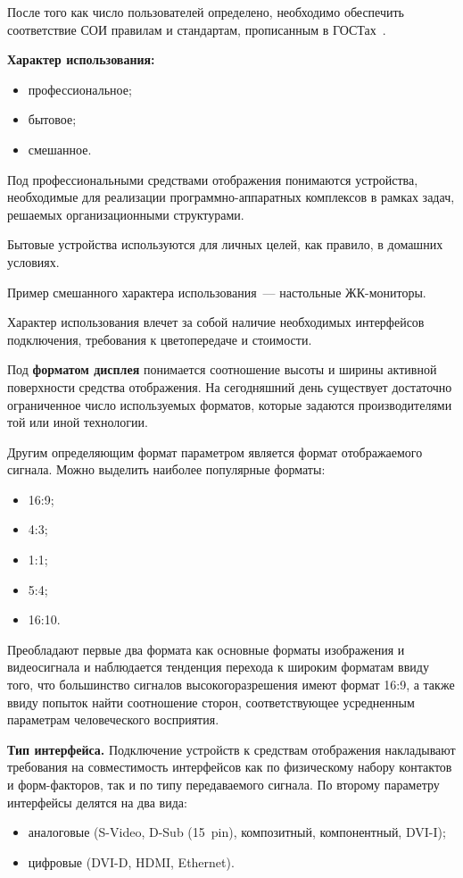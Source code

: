 \begin{multicols}{2}
     После того как число пользователей определено, необходимо 
обеспечить соответствие СОИ правилам и стандартам, прописанным в 
ГОСТах~\cite{13chu, 14chu}. 

\textbf{Характер использования:}
\begin{itemize}
\item профессиональное;
\item бытовое;
\item смешанное.
\end{itemize}
   
   Под профессиональными средствами отображения понимаются 
устройства, необходимые для реализации программно-аппаратных 
комплексов в рамках задач, решаемых организационными структурами. 
   
   Бытовые устройства используются для личных целей, как правило, в 
домашних условиях. 
   
   Пример смешанного характера использования~--- настольные 
   ЖК-мониторы.
   
   Характер использования влечет за собой наличие необходимых 
интерфейсов подключения, требования к цветопередаче и стоимости.
     
     Под \textbf{форматом дисплея} понимается соотношение высоты и 
ширины активной поверхности средства отображения. На сегодняшний день 
существует достаточно ограниченное число используемых форматов, 
которые задаются производителями той или иной технологии. 
     
     Другим определяющим формат параметром является формат 
отображаемого сигнала. Можно выделить наиболее популярные форматы: 
     \begin{itemize}
\item 16:9;
\item 4:3;
\item 1:1;
\item 5:4;
\item 16:10.
\end{itemize}

Преобладают первые два формата как основные форматы изображения и 
видеосигнала и наблюдается тенденция перехода к широким форматам ввиду 
того, что большинство сигналов высокого\linebreak разрешения имеют формат 16:9, а 
также ввиду попыток найти соотношение сторон, со\-от\-вет\-ст\-ву\-ющее 
усредненным параметрам человеческого восприятия. 

     \textbf{Тип интерфейса.} Подключение устройств к средствам 
отображения накладывают требования на сов\-мес\-ти\-мость интерфейсов как по 
физическому набору контактов и форм-факторов, так и по типу 
передаваемого сигнала. По второму параметру интерфейсы делятся на два 
вида:
     \begin{itemize}
\item аналоговые (S-Video, D-Sub (15~pin), композитный, компонентный, 
DVI-I); 
\item цифровые (DVI-D, HDMI, Ethernet).
 \end{itemize}


\end{multicols}

